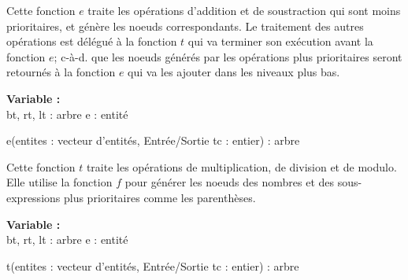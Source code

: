 \par
Cette fonction $e$ traite les opérations d'addition et de soustraction qui sont moins prioritaires, et génère les noeuds correspondants. Le traitement des autres opérations est délégué à la fonction $t$ qui va terminer son exécution avant la fonction $e$; c-à-d. que les noeuds générés par les opérations plus prioritaires seront retournés à la fonction $e$ qui va les ajouter dans les niveaux plus bas.\\
\begin{function}[H]
    \textbf{Variable :}\\
    bt, rt, lt : arbre\;
    e : entité\;
    \caption{e(entites : vecteur d'entités, Entrée/Sortie tc : entier) : arbre}
\end{function}

\par
Cette fonction $t$ traite les opérations de multiplication, de division et de modulo. Elle utilise la fonction $f$ pour générer les noeuds des nombres et des sous-expressions plus prioritaires comme les parenthèses.\\
\begin{function}[H]
    \textbf{Variable :}\\
    bt, rt, lt : arbre\;
    e : entité\;
    \caption{t(entites : vecteur d'entités, Entrée/Sortie tc : entier) : arbre}
\end{function}

